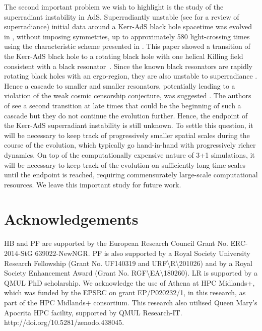 \documentclass[aps,letterpaper,twocolumn,nofootinbib]{revtex4}
\numberwithin{equation}{section}
\begin{document}
The second important problem we wish to highlight is the study of the superradiant instability in AdS.
Superradiantly unstable (see \cite{Brito:2015oca} for a review of superradiance) initial data around a Kerr-AdS black hole spacetime was evolved in \cite{Chesler:2018txn}, without imposing symmetries, up to approximately 580 light-crossing times using the characteristic scheme presented in \cite{Chesler:2013lia}. This paper showed a transition of the Kerr-AdS black hole to a rotating black hole with one helical Killing field consistent with a black resonator~\cite{Dias:2015rxy}. Since the known black resonators are rapidly rotating black holes with an ergo-region, they are also unstable to superradiance \cite{Hawking:1999dp,Green:2015kur}. Hence a cascade to smaller and smaller resonators, potentially leading to a violation of the weak cosmic censorship conjecture, was suggested \cite{Niehoff:2015oga}. 
The authors of \cite{Chesler:2018txn} see a second transition at late times that could be the beginning of such a cascade but they do not continue the evolution further. 
Hence, the endpoint of the Kerr-AdS superradiant instability is still unknown.
To settle this question, it will be necessary to keep track of progressively smaller spatial scales during the course of the evolution, which typically go hand-in-hand with progressively richer dynamics.
On top of the computationally expensive nature of 3+1 simulations, it will be necessary to keep track of the evolution on sufficiently long time scales until the endpoint is reached, requiring commensurately large-scale computational resources.
We leave this important study for future work.



\section*{Acknowledgements}
HB and PF are supported by the European Research Council Grant No. ERC-2014-StG 639022-NewNGR. PF is also supported by a Royal Society University Research Fellowship (Grant No. UF140319 and URF\textbackslash R\textbackslash 201026) and by a Royal Society Enhancement Award (Grant No. RGF\textbackslash EA\textbackslash 180260). LR is supported by a QMUL PhD scholarship. We acknowledge the use of Athena at HPC Midlands+, which was funded by the EPSRC on 
grant EP/P020232/1, in this research, as part of the HPC Midlands+ consortium. This research also utilised Queen Mary's Apocrita HPC facility, supported by QMUL Research-IT. http://doi.org/10.5281/zenodo.438045.
\end{document}
